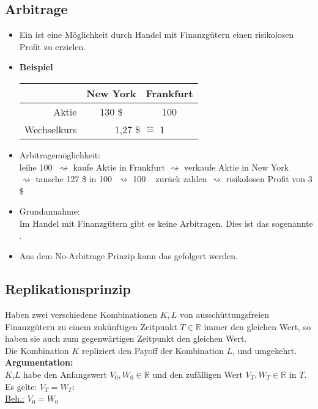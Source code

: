 \subsection{Arbitrage} %
\label{sub:arbitrage}
\begin{itemize}
	\item Ein  ist eine Möglichkeit durch Handel mit Finanzgütern einen risikolosen Profit zu erzielen.
	\item \textbf{Beispiel} \\
	\begin{tabular}{r | c c}
		& New York & Frankfurt \\
		\hline
		Aktie & 130 \$ & 100 \texteuro \\
		Wechselkurs & \multicolumn{2}{c}{1,27 \$ $\mathrel{\hat=}$ 1 \texteuro } \\
	\end{tabular}
	\item Arbitragemöglichkeit: \\
	leihe 100 \texteuro $~\rightsquigarrow$ kaufe Aktie in Frankfurt $\rightsquigarrow$ verkaufe Aktie in New York\\ $\rightsquigarrow$ tausche 127 \$ in 100 \texteuro  $~\rightsquigarrow$ 100 \texteuro~  zurück zahlen $\rightsquigarrow$ risikolosen Profit von 3 \$
	\item Grundannahme: \\
	Im Handel mit Finanzgütern gibt es keine Arbitragen. Dies ist das sogenannte . 
	\item Aus dem No-Arbitrage Prinzip kann das  gefolgert werden.	
\end{itemize}

\subsection{Replikationsprinzip}
\label{sub: replikationsprinzip}
Haben zwei verschiedene Kombinationen $K,L$ von ausschüttungsfreien Finanzgütern zu einem zukünftigen Zeitpunkt $T \in \mathds{R}$ immer den gleichen Wert, so haben sie auch zum gegenwärtigen Zeitpunkt den gleichen Wert. \\
Die Kombination $K$ repliziert den Payoff der Kombination $L$, und umgekehrt.\\
\textbf{Argumentation:}\\
$K$,$L$ habe den Anfangswert $V_0,W_0 \in \mathds{R}$ und den zufälligen Wert $V_T,W_T \in \mathds{R}$ in $T$. \\
Es gelte: $V_T = W_T$: \\
\underline{Beh.:} $V_0 = W_0$ \\


